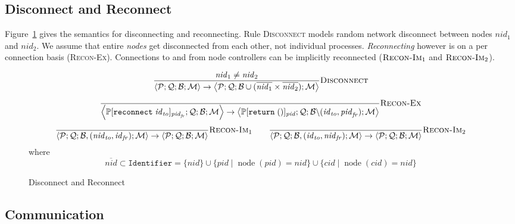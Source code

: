 \documentclass{article}
\newcommand{\sReturn}{\mathtt{return}}
\newcommand{\sReconnect}{\mathtt{reconnect}}
\DeclareMathOperator{\sNodeOf}{node}
\newcommand{\sNid}{\ensuremath{\mathit{nid}}}
\newcommand{\sPid}{\ensuremath{\mathit{pid}}}
\newcommand{\sCid}{\ensuremath{\mathit{cid}}}
\newcommand{\sId}{\ensuremath{\mathit{id}}}
\newcommand{\sSystem}[4]{\left\langle #1 ; #2 ; #3 ; #4 \right\rangle}
\newcommand{\sQueue}{\mathcal{Q}}
\newcommand{\sProcesses}{\mathcal{P}}
\newcommand{\sBlacklist}{\mathcal{B}}
\newcommand{\sMonitors}{\mathcal{M}}
\newcommand{\sCtxt}[1]{\mathbb{#1}}
\newcommand{\where}{\mathrel{|}}
\begin{document}
\subsection{Disconnect and Reconnect}

Figure~\ref{fig:disconnect} gives the semantics for disconnecting and
reconnecting.  Rule \textsc{Disconnect} models random network disconnect
between nodes $\sNid_1$ and $\sNid_2$.  We assume that entire \emph{nodes} get
disconnected from each other, not individual processes. \emph{Reconnecting}
however is on a per connection basis (\textsc{Recon-Ex}).  Connections to and
from node controllers can be implicitly reconnected ($\textsc{Recon-Im}_1$ and
$\textsc{Recon-Im}_2$).

\begin{figure}
\small
\begin{equation*}
\frac{
  \sNid_1 \neq \sNid_2
}{
  \sSystem{\sProcesses}{\sQueue}{\sBlacklist}{\sMonitors}
\rightarrow
  \sSystem{\sProcesses}{\sQueue}{\sBlacklist \cup (\overline{\sNid_1} \times \overline{\sNid_2})}{\sMonitors}
} \textsc{Disconnect}
\end{equation*}
%
\begin{equation*}
\frac{
}{
  \sSystem{\sCtxt{P}[ \sReconnect \; \sId_\mathit{to} ]_{\sPid_\mathit{fr}}}
          {\sQueue}
          {\sBlacklist}
          {\sMonitors}
\rightarrow
  \sSystem{\sCtxt{P}[ \sReturn \; () ]_\sPid}
          {\sQueue}
          {\sBlacklist \backslash (\sId_\mathit{to}, \sPid_\mathit{fr})}
          {\sMonitors}
} \textsc{Recon-Ex}
\end{equation*}
%
\begin{equation*}
\frac{
}{
  \sSystem{\sProcesses}{\sQueue}{\sBlacklist, (\sNid_\mathit{to}, \sId_\mathit{fr})}{\sMonitors}
\rightarrow
  \sSystem{\sProcesses}{\sQueue}{\sBlacklist}{\sMonitors}
} \textsc{Recon-Im}_1
\qquad
\frac{
}{
  \sSystem{\sProcesses}{\sQueue}{\sBlacklist, (\sId_\mathit{to}, \sNid_\mathit{fr})}{\sMonitors}
\rightarrow
  \sSystem{\sProcesses}{\sQueue}{\sBlacklist}{\sMonitors}
} \textsc{Recon-Im}_2
\end{equation*}
%
where
%
\begin{equation*}
\overline{\sNid} \subset \mathtt{Identifier} 
  = \{ \sNid \} \cup 
    \{ \sPid \where \sNodeOf(\sPid) = \sNid \} \cup
    \{ \sCid \where \sNodeOf(\sCid) = \sNid \} 
\end{equation*}
\caption{\label{fig:disconnect}Disconnect and Reconnect}
\end{figure}

\subsection{Communication}
\end{document}
